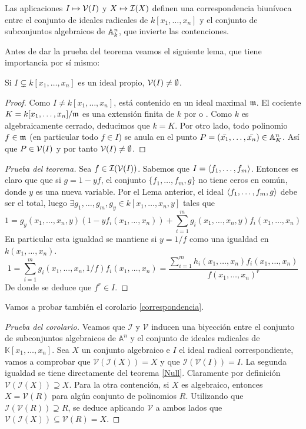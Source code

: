 \documentclass[ACGA.tex]{subfiles}
\begin{document}
\begin{coro}\label{correspondencia} Las aplicaciones $I\mapsto \mathcal{V}(I)$ y $X\mapsto \mathcal{I}(X)$ definen una correspondencia biunívoca entre el conjunto de ideales radicales de $k[x_1,\ldots,x_n]$ y el conjunto de subconjuntos algebraicos de $\mathbb{A}^n_k$, que invierte las contenciones. 
 \end{coro}

Antes de dar la prueba del teorema veamos el siguiente lema, que tiene importancia por sí mismo:

\begin{lemma}
 Si $I\subsetneq k[x_1,\ldots,x_n]$ es un ideal propio, $\mathcal{V}(I)\neq\emptyset$.
\end{lemma}

\begin{proof}
 Como $I\neq k[x_1,\ldots,x_n]$, está contenido en un ideal maximal ${\mathfrak{m}}$. El cociente $K=k[x_1,\ldots,x_n]/{\mathfrak{m}}$ es una extensión finita de $k$ por \cite[Teorema 4.10]{reid} o \cite[Corolario 5.24]{am}. Como $k$ es algebraicamente cerrado, deducimos que $k=K$. Por otro lado, todo polinomio $f\in{\mathfrak{m}}$ (en particular todo $f\in I$) se anula en el punto $P=(\bar{x_1},\ldots,\bar{x_n})\in\mathbb{A}^n_K$. Así que $P\in\mathcal{V}(I)$ y por tanto $\mathcal{V}(I)\neq \emptyset$.
\end{proof}

\begin{proof}[Prueba del teorema] Sea $f\in\mathcal{I}(\mathcal{V}(I))$. Sabemos que $I=\langle{f_1,\dotsc,f_m}\rangle$. Entonces es claro que que si $g=1-yf$, el conjunto $\{f_1,\dotsc,f_m,g\}$ no tiene ceros en común, donde $y$ es una nueva variable. Por el Lema anterior, el ideal $\langle{f_1,\dotsc,f_m,g}\rangle$ debe ser el total, luego $\exists g_1,\dotsc,g_m,g_y \in k[x_1,\dotsc,x_n,y]$ tales que
$$
1 = g_y(x_1,\dotsc,x_n,y) (1-yf_i(x_1,\dotsc,x_n)) + \sum_{i=1}^m g_i(x_1,\dotsc,x_n,y) f_i(x_1,\dotsc,x_n)
$$
En particular esta igualdad se mantiene si $y=1/f$ como una igualdad en $k(x_1,\dotsc,x_n)$. 
$$
1 = \sum_{i=1}^m g_i(x_1,\dotsc,x_n,1/f) f_i(x_1,\dotsc,x_n) = \frac{\sum_{i=1}^m h_i(x_1,\dotsc,x_n)f_i(x_1,\dotsc,x_n)}{f(x_1,\dotsc,x_n)^r}
$$
De donde se deduce que $f^r\in I$.
\end{proof}

Vamos a probar también el corolario \ref{correspondencia}.
\begin{proof}[Prueba del corolario]
Veamos que $\mathcal{I}$ y $\mathcal{V}$ inducen una biyección entre el conjunto de subconjuntos algebraicos de $\mathbb{A}^n$ y el conjunto de ideales radicales de $\mathbb{K}[x_1,\dots,x_n]$. Sea $X$ un conjunto algebraico e $I$ el ideal radical correspondiente, vamos a comprobar que $\mathcal{V}(\mathcal{I}(X))=X$ y que $\mathcal{I}(\mathcal{V}(I))=I $. La segunda igualdad se tiene directamente del teorema \ref{Null}.  Claramente por definición $\mathcal{V}(\mathcal{I}(X))\supseteq X$. Para la otra contención, si $X$ es algebraico, entonces $X=\mathcal{V}(R)$ para algún conjunto de polinomios $R$. Utilizando que $\mathcal{I}(\mathcal{V}(R))\supseteq R$, se deduce aplicando $\mathcal{V}$ a ambos lados que $\mathcal{V}(\mathcal{I}(X))\subseteq \mathcal{V}(R)=X$.


\end{proof}
\end{document}
